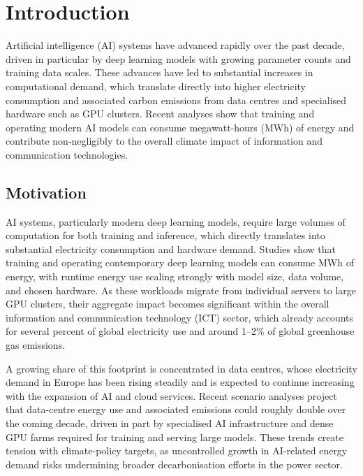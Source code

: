 \chapter{Introduction}

Artificial intelligence (AI) systems have advanced rapidly over the past decade, driven in particular by 
deep learning models with growing parameter counts and training data scales. These advances have led 
to substantial increases in computational demand, which translate directly into higher electricity 
consumption and associated carbon emissions from data centres and specialised hardware such as GPU clusters. 
Recent analyses show that training and operating modern AI models can consume megawatt-hours (MWh) of energy 
and contribute non-negligibly to the overall climate impact of information and communication technologies.

\section{Motivation}

AI systems, particularly modern deep learning models, require large volumes of computation for both training 
and inference, which directly translates into substantial electricity consumption and hardware demand. 
Studies show that training and operating contemporary deep learning models can consume MWh of energy, 
with runtime energy use scaling strongly with model size, data volume, and chosen hardware. As these workloads 
migrate from individual servers to large GPU clusters, their aggregate impact becomes significant within the overall 
information and communication technology (ICT) sector, which already accounts for several percent of global electricity 
use and around 1--2\% of global greenhouse gas emissions.

A growing share of this footprint is concentrated in data centres, whose electricity demand in Europe has been 
rising steadily and is expected to continue increasing with the expansion of AI and cloud services. 
Recent scenario analyses project that data-centre energy use and associated emissions could roughly double over 
the coming decade, driven in part by specialised AI infrastructure and dense GPU farms required for training and 
serving large models. These trends create tension with climate-policy targets, as uncontrolled growth in AI-related 
energy demand risks undermining broader decarbonisation efforts in the power sector.

